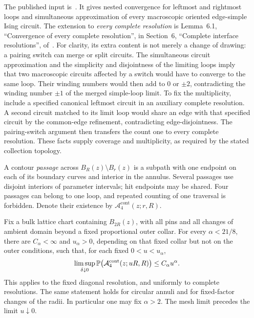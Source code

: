 The published input is~\cite[Theorem~6, its following common-edge
refinement, and Remark~7]{BH2019}. It gives nested convergence for
leftmost and rightmost loops and simultaneous approximation of every
macroscopic oriented edge-simple Ising circuit. The extension to
\emph{every complete resolution} is Lemma~6.1, ``Convergence of every
complete resolution'', in Section~6, ``Complete interface resolutions'',
of~\cite{OpenAIStatic2026}. For clarity, its extra content is not merely a
change of drawing: a pairing switch can merge or split circuits.
The simultaneous circuit approximation and the simplicity and
disjointness of the limiting loops imply that two macroscopic circuits
affected by a switch would have to converge to the same loop. Their
winding numbers would then add to \(0\) or \(\pm2\), contradicting
the winding number \(\pm1\) of the merged simple-loop limit. To fix the
multiplicity, include a specified canonical leftmost circuit in an
auxiliary complete resolution. A second circuit matched to its limit
loop would share an edge with that specified circuit by the common-edge
refinement, contradicting edge-disjointness. The pairing-switch argument
then transfers the count one to every complete resolution. These facts
supply coverage and multiplicity, as required by the stated collection
topology.

A contour \emph{passage} across \(B_R(z)\setminus B_r(z)\) is a
subpath with one endpoint on each of its boundary curves and interior
in the annulus. Several passages use disjoint interiors of parameter
intervals; hit endpoints may be shared. Four passages can belong to
one loop, and repeated counting of one traversal is forbidden. Denote
their existence by \(\mathcal A_4^{\mathrm{cont}}(z;r,R)\).

\begin{proposition}
\label{prop:pure-four-passages}
Fix a bulk lattice chart containing \(B_{2R}(z)\), with all pins and
all changes of ambient domain beyond a fixed proportional outer
collar. For every \(\alpha<21/8\), there are \(C_\alpha<\infty\)
and \(u_\alpha>0\), depending on that fixed collar but not on the
outer conditions, such that, for each fixed \(0<u<u_\alpha\),
\begin{equation}
 \limsup_{\delta\downarrow0}
 \P\bigl(\mathcal A_4^{\mathrm{cont}}(z;uR,R)\bigr)
 \le C_\alpha u^\alpha.
 \label{eq:pure-four-passages}
\end{equation}
This applies to the fixed diagonal resolution, and uniformly to
complete resolutions. The same statement holds for circular annuli
and for fixed-factor changes of the radii. In particular one may fix
\(\alpha>2\). The mesh limit precedes the limit \(u\downarrow0\).
\end{proposition}

